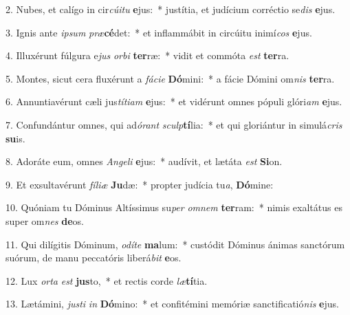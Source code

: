 2. Nubes, et calígo in cir\textit{cú}\textit{i}\textit{tu} \textbf{e}jus:~*  justítia, et judícium corréctio se\textit{dis} \textbf{e}jus.\

3. Ignis ante \textit{ip}\textit{sum} \textit{præ}\textbf{cé}det:~*  et inflammábit in circúitu inimí\textit{cos} \textbf{e}jus.\

4. Illuxérunt fúlgura e\textit{jus} \textit{or}\textit{bi} \textbf{ter}ræ:~*  vidit et commóta \textit{est} \textbf{ter}ra.\

5. Montes, sicut cera fluxérunt a \textit{fá}\textit{ci}\textit{e} \textbf{Dó}mini:~*  a fácie Dómini om\textit{nis} \textbf{ter}ra.\

6. Annuntiavérunt cæli jus\textit{tí}\textit{ti}\textit{am} \textbf{e}jus:~*  et vidérunt omnes pópuli glóri\textit{am} \textbf{e}jus.\

7. Confundántur omnes, qui ad\textit{ó}\textit{rant} \textit{sculp}\textbf{tí}lia:~*  et qui gloriántur in simulá\textit{cris} \textbf{su}is.\

8. Adoráte eum, omnes \textit{An}\textit{ge}\textit{li} \textbf{e}jus:~*  audívit, et lætáta \textit{est} \textbf{Si}on.\

9. Et exsultavérunt \textit{fí}\textit{li}\textit{æ} \textbf{Ju}dæ:~*  propter judícia tu\textit{a}, \textbf{Dó}mine:\

10. Quóniam tu Dóminus Altíssimus su\textit{per} \textit{om}\textit{nem} \textbf{ter}ram:~*  nimis exaltátus es super om\textit{nes} \textbf{de}os.\

11. Qui dilígitis Dóminum, \textit{o}\textit{dí}\textit{te} \textbf{ma}lum:~*  custódit Dóminus ánimas sanctórum suórum, de manu peccatóris liberá\textit{bit} \textbf{e}os.\

12. Lux \textit{or}\textit{ta} \textit{est} \textbf{jus}to,~*  et rectis corde \textit{læ}\textbf{tí}tia.\

13. Lætámini, \textit{jus}\textit{ti} \textit{in} \textbf{Dó}mino:~*  et confitémini memóriæ sanctificatió\textit{nis} \textbf{e}jus.\

